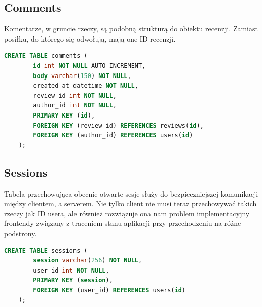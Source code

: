 \documentclass{report}
\begin{document}
\subsection*{Comments}
Komentarze, w gruncie rzeczy, są podobną strukturą do obiektu recenzji.
Zamiast posiłku, do którego się odwołują, mają one ID recenzji.
\begin{lstlisting}[language=SQL]
    CREATE TABLE comments (
        id int NOT NULL AUTO_INCREMENT, 
        body varchar(150) NOT NULL, 
        created_at datetime NOT NULL, 
        review_id int NOT NULL, 
        author_id int NOT NULL,
        PRIMARY KEY (id),
        FOREIGN KEY (review_id) REFERENCES reviews(id),
        FOREIGN KEY (author_id) REFERENCES users(id)
    );
\end{lstlisting}

\subsection*{Sessions}
Tabela przechowująca obecnie otwarte sesje służy do bezpieczniejszej
komunikacji między clientem, a serverem. Nie tylko client nie musi teraz
przechowywać takich rzeczy jak ID usera, ale również rozwiązuje ona nam
problem implementacyjny frontendy związany z traceniem stanu aplikacji
przy przechodzeniu na różne podstrony. 
\begin{lstlisting}[language=SQL]
    CREATE TABLE sessions (
        session varchar(256) NOT NULL,
        user_id int NOT NULL,
        PRIMARY KEY (session),
        FOREIGN KEY (user_id) REFERENCES users(id)
    );
\end{lstlisting}
\end{document}
